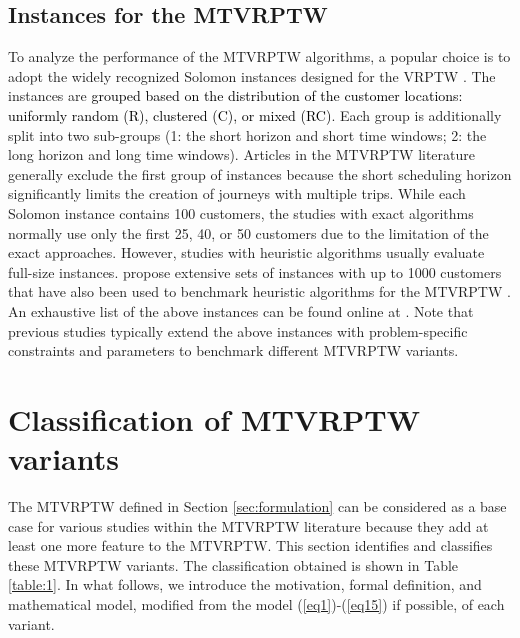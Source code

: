 \documentclass[11pt]{article}
\newcommand\add[1]{\textcolor{black}{#1}}
\begin{document}
\subsection{Instances for the MTVRPTW}

To analyze the performance of the MTVRPTW algorithms, a popular choice is to adopt the widely recognized Solomon instances designed for the VRPTW \citep{solomon1987algorithms}.  The instances are \add{grouped based on the distribution of the customer locations: uniformly random (R), clustered (C), or mixed (RC)}.  Each group is additionally split into two sub-groups (1: the short horizon and short time windows; 2: the long horizon and long time windows).  Articles in the MTVRPTW literature generally exclude the first group of instances because the short scheduling horizon significantly limits the creation of journeys with multiple trips.  While each Solomon instance contains 100 customers, the studies with exact algorithms normally use only the first 25, 40, or 50 customers due to the limitation of the exact approaches.  However, studies with heuristic algorithms usually evaluate full-size instances.  \cite{gehring1999parallel} propose extensive sets of instances with up to 1000 customers that have also been used to benchmark heuristic algorithms for the MTVRPTW \citep[see][]{cattaruzza2014iterated}.  An exhaustive list of the above instances can be found online at \cite{sintef}.  Note that previous studies typically extend the above instances with problem-specific constraints and parameters to benchmark different MTVRPTW variants.

\section{Classification of MTVRPTW variants}
\label{sec:variants}

The MTVRPTW defined in Section \ref{sec:formulation} can be considered as a base case for various studies within the MTVRPTW literature because they add at least one more feature to the MTVRPTW.  This section identifies and classifies these MTVRPTW variants. The classification obtained is shown in Table \ref{table:1}.  In what follows, we introduce the motivation, formal definition, and mathematical model, modified from the model (\ref{eq1})-(\ref{eq15}) if possible, of each variant.
\end{document}
